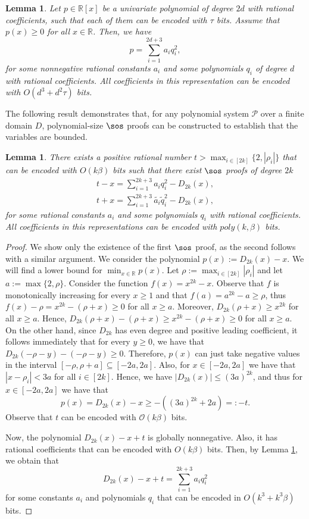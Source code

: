 \documentclass[11pt]{article}
\newtheorem{lemma}[theorem]{Lemma}
\begin{document}
\begin{lemma}\label{lemma-rational-sq}\cite[Section 4, Thm 23]{magron-schwei}
    Let $p\in \mathbb{R}[x]$ be a univariate polynomial of degree $2d$ with rational coefficients, such that each of them can be encoded with $\tau$ bits. Assume that $p(x)\geq 0$ for all $x\in \mathbb{R}$. Then, we have 
    $$p=\sum_{i=1}^{2d+3}a_iq_i^2,$$
    for some nonnegative rational constants $a_i$ and some polynomials $q_i$ of degree $d$ with rational coefficients. All coefficients in this representation can be encoded with ${O}(d^3 +d^2\tau)$ bits.
\end{lemma}
%
The following result demonstrates that, for any polynomial system \(\mathcal{P}\) over a finite domain \(D\), polynomial-size \(\sos\) proofs can be constructed to establish that the variables are bounded.
\begin{lemma}\label{lemma-new-t}
    There exists a positive rational number $t>\max_{i\in [2k]}\{2,|\rho_i|\}$ that can be encoded with ${O}(k\beta)$ bits such that there exist $\sos$ proofs of degree $2k$
    \begin{align}
        t-x = \sum_{i=1}^{2k+3}a_iq_i^2 - D_{2k}(x), \\
        t+x = \sum_{i=1}^{2k+3}\tilde{a_i}\tilde{q}_i^2 - D_{2k}(x),
    \end{align}
 for some rational constants $a_i$ and some polynomials $q_i$ with rational coefficients. All coefficients in this representations can be encoded with $poly(k,\beta)$ bits.
\end{lemma}
\begin{proof}
    We show only the existence of the first $\sos$ proof, as the second follows with a similar argument. We consider the polynomial $p(x):= D_{2k}(x)-x$. We will find a lower bound for $\min_{x\in \mathbb{R}} p(x)$. Let $\rho := \max_{i\in [2k]}|\rho_i|$ and let $a := \max\{2, \rho\}$. Consider the function $f(x) = x^{2k} - x$. Observe that $f$ is monotonically increasing for every $x \geq 1$ and that $f(a) = a^{2k} - a \geq \rho$, thus $f(x) - \rho = x^{2k} - (\rho + x) \geq 0$ for all $x \geq a$. Moreover, $D_{2k}(\rho + x) \geq x^{2k}$ for all $x \geq a$. Hence, $D_{2k}(\rho + x)-(\rho+x) \geq x^{2k} - (\rho+x) \geq 0$ for all $x\geq a$. On the other hand, since $D_{2k}$ has even degree and positive leading coefficient, it follows immediately that for every $y \geq 0$, we have that $D_{2k}(-\rho-y)-(-\rho-y)\geq 0$. Therefore, $p(x)$ can just take negative values in the interval $[-\rho,\rho+a] \subseteq [-2a, 2a]$. Also, for $x\in [-2a,2a]$ we have that $|x-\rho_i|<3a$ for all $i\in[2k]$. Hence, we have $|D_{2k}(x)|\leq (3a)^{2k}$, and thus for $x\in [-2a,2a]$ we have that
    $$p(x)= D_{2k}(x)- x \geq -((3a)^{2k}+2a)=:-t.$$
    Observe that $t$ can be encoded with $\mathcal{O}(k\beta)$ bits.

    Now, the polynomial $D_{2k}(x)-x+t$ is globally nonnegative. Also, it has rational coefficients that can be encoded with $O(k\beta)$ bits. Then, by Lemma \ref{lemma-rational-sq}, we obtain that 
    $$D_{2k}(x)-x+t = \sum_{i=1}^{2k+3}a_iq_i^2 $$
    for some constants $a_i$ and polynomials $q_i$ that can be encoded in $O(k^3 + k^3\beta)$ bits.
\end{proof}
\end{document}
